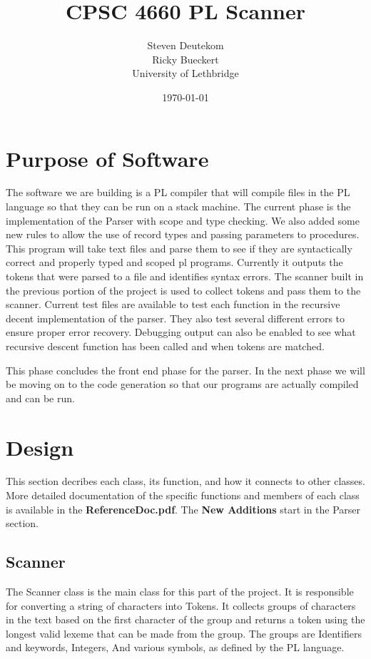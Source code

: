 \documentclass{article}
\begin{document}
\title{CPSC 4660 PL Scanner}
\author{Steven Deutekom\\
        Ricky Bueckert\\
        University of Lethbridge}
\date{\today}

\maketitle

\section{Purpose of Software}
The software we are building is a PL compiler that will compile files in the PL
language so that they can be run on a stack machine. The current phase is the
implementation of the Parser with scope and type checking. We also added some new rules
to allow the use of record types and passing parameters to procedures.
This program will take text files and parse them to see if they are syntactically correct
and properly typed and scoped
pl programs. Currently it outputs the tokens that were parsed to a file and identifies
syntax errors. The scanner built in the previous portion of the project is used to
collect tokens and pass them to the scanner. Current test files are available to
test each function in the recursive decent implementation of the parser. They also test
several different errors to ensure proper error recovery. Debugging output can also be
enabled to see what recursive descent function has been called and when tokens are matched.

This phase concludes the front end phase for the parser. In the next phase we will be moving on
to the code generation so that our programs are actually compiled and can be run.


\section{Design}
This section decribes each class, its function, and how it connects to other classes.
More detailed documentation of the specific functions and members of each class
is available in the \textbf{ReferenceDoc.pdf}. The \textbf{New Additions} start in the
Parser section.

\subsection{Scanner}
The Scanner class is the main class for this part of the project. It is responsible
for converting a string of characters into Tokens. It collects groups of characters
in the text based on the first character of the group and returns a token
using the longest valid lexeme that can be made from the group. The groups
are Identifiers and keywords, Integers, And various symbols, as defined by the
PL language.
\end{document}
